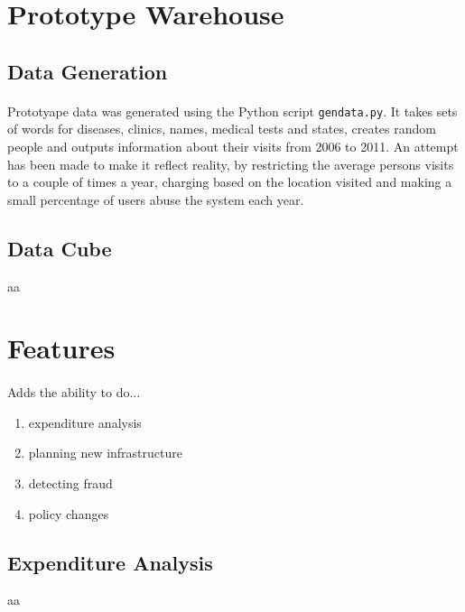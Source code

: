 \documentclass[a4paper,12pt,openbib]{article}
\begin{document}
\section*{Prototype Warehouse}
\subsection*{Data Generation}
\paragraph{}
	Prototyape data was generated using the Python script \texttt{gendata.py}.
	It takes sets of words for diseases, clinics, names, medical tests and states, creates random people and outputs information about their visits from 2006 to 2011.
	An attempt has been made to make it reflect reality, by restricting the average persons visits to a couple of times a year, charging based on the location visited and making a small percentage of users abuse the system each year.

\subsection*{Data Cube}
	aa

\section*{Features}
\paragraph{}
Adds the ability to do...
\begin{enumerate}
	\item expenditure analysis
	\item planning new infrastructure
	\item detecting fraud
	\item policy changes
\end{enumerate}

\subsection*{Expenditure Analysis}
	aa
\end{document}
